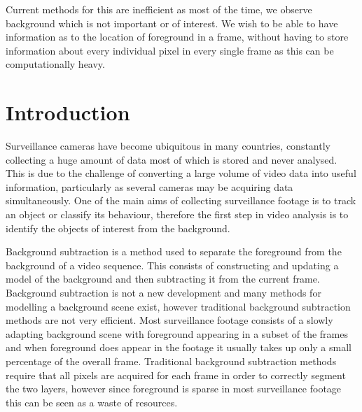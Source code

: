 Current methods for this are inefficient as most of the time, we observe background which is not important or of interest. We wish to be able to have information as to the location of foreground in a frame, without having to store information about every individual pixel in every single frame as this can be computationally heavy. 



\section{Introduction}
Surveillance cameras have become ubiquitous in many countries, constantly collecting a huge amount of data most of which is stored and never analysed. This is due to the challenge of converting a large volume of video data into useful information, particularly as several cameras may be acquiring data simultaneously. One of the main aims of collecting surveillance footage is to track an object or classify its behaviour, therefore the first step in video analysis is to identify the objects of interest from the background.


Background subtraction
is a method used to separate the foreground from the background of a video sequence. This consists of constructing and updating a model of the background and then subtracting it from the current frame. Background subtraction is not a new development and many methods for modelling a background scene exist, however traditional background subtraction methods are not very efficient. Most surveillance footage consists of a slowly adapting background scene with foreground appearing in a subset of the frames and when foreground does appear in the footage it usually takes up only a small percentage of the overall frame. Traditional background subtraction methods require that all pixels are acquired for each frame in order to correctly segment the two layers, however since foreground is sparse in most surveillance footage this can be seen as a waste of resources. 


